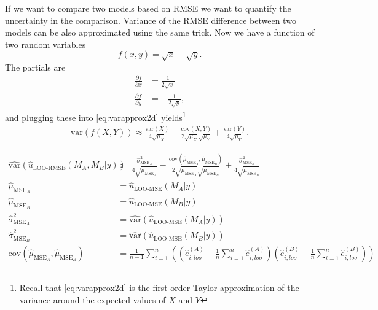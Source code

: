 \documentclass{article}
\newcommand{\residual}[2][i]{\hat{e}_{#1}^{(#2)}}
\begin{document}
If we want to compare two models based on RMSE we want to quantify the uncertainty in the comparison. Variance of the RMSE difference between two models can be also approximated using the same trick. Now we have a function of two random variables
$$
f(x,y) = \sqrt{x} - \sqrt{y}.
$$
The partials are
\begin{align*}
    \frac{\partial f}{\partial x} &= \frac{1}{2 \sqrt{x}} \\
    \frac{\partial f}{\partial y} &= -\frac{1}{2 \sqrt{y}},
\end{align*}
and plugging these into \eqref{eq:varapprox2d} yields\footnote{Recall that \eqref{eq:varapprox2d} is the first order Taylor approximation of the variance around the expected values of $X$ and $Y$}
\begin{align*}
    \text{var}\left(f(X,Y)\right) \approx \frac{\text{var}(X)}{4\sqrt{\mu_X}} - \frac{\text{cov}(X,Y)}{2 \sqrt{\mu_X} \sqrt{\mu_Y}} + \frac{\text{var}(Y)}{4\sqrt{\mu_Y}}.
\end{align*}

\begin{equation}
\begin{aligned}
\widehat{\text{var}} \left( \hat{u}_{\text{LOO-RMSE}}(M_A, M_B | y) \right) &:=  \frac{\hat{\sigma}^2_{\text{MSE}_A}}{4\sqrt{\hat{\mu}_{\text{MSE}_A}}} - 
\frac{\text{cov}(\hat{\mu}_{\text{MSE}_A},\hat{\mu}_{\text{MSE}_B})}{2 \sqrt{\hat{\mu}_{\text{MSE}_A}} \sqrt{\hat{\mu}_{\text{MSE}_B}}} + 
\frac{\hat{\sigma}^2_{\text{MSE}_B}}{4\sqrt{\hat{\mu}_{\text{MSE}_B}}} \\
\hat{\mu}_{\text{MSE}_A} &= \hat{u}_{\text{LOO-MSE}}(M_A | y)\\
\hat{\mu}_{\text{MSE}_B} &= \hat{u}_{\text{LOO-MSE}}(M_B | y)\\
\hat{\sigma}^2_{\text{MSE}_A} &= \widehat{\text{var}}\left(\hat{u}_{\text{LOO-MSE}}(M_A | y)\right) \\
\hat{\sigma}^2_{\text{MSE}_B} &= \widehat{\text{var}}\left(\hat{u}_{\text{LOO-MSE}}(M_B | y)\right) \\
\text{cov}(\hat{\mu}_{\text{MSE}_A},\hat{\mu}_{\text{MSE}_B}) &= \frac{1}{n -1 } \sum_{i = 1}^n \left( \left( \residual[i,loo]{A} - \frac{1}{n} \sum_{i=1}^n \residual[i,loo]{A} \right) \left( \residual[i,loo]{B} - \frac{1}{n} \sum_{i=1}^n \residual[i,loo]{B} \right) \right)
\end{aligned}\label{eq:var-loo-rmse-diff}
\end{equation}
\end{document}
